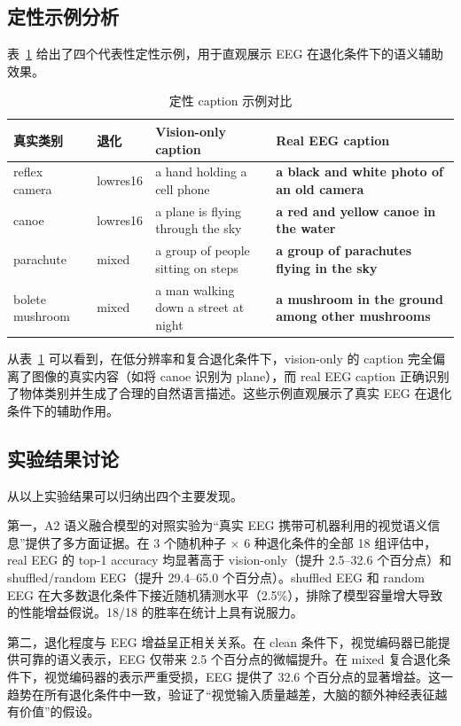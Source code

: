 \subsection{定性示例分析}

表~\ref{tab:qualitative} 给出了四个代表性定性示例，用于直观展示 EEG 在退化条件下的语义辅助效果。

\begin{table}[htbp]
  \centering
  \caption{定性 caption 示例对比}
  \label{tab:qualitative}
  \begin{tabularx}{\linewidth}{l l X X}
    \toprule
    真实类别 & 退化 & Vision-only caption & Real EEG caption \\
    \midrule
    reflex camera & lowres16 & a hand holding a cell phone & \textbf{a black and white photo of an old camera} \\
    canoe & lowres16 & a plane is flying through the sky & \textbf{a red and yellow canoe in the water} \\
    parachute & mixed & a group of people sitting on steps & \textbf{a group of parachutes flying in the sky} \\
    bolete mushroom & mixed & a man walking down a street at night & \textbf{a mushroom in the ground among other mushrooms} \\
    \bottomrule
  \end{tabularx}
\end{table}

从表~\ref{tab:qualitative} 可以看到，在低分辨率和复合退化条件下，vision-only 的 caption 完全偏离了图像的真实内容（如将 canoe 识别为 plane），而 real EEG caption 正确识别了物体类别并生成了合理的自然语言描述。这些示例直观展示了真实 EEG 在退化条件下的辅助作用。

\subsection{实验结果讨论}

从以上实验结果可以归纳出四个主要发现。

第一，A2 语义融合模型的对照实验为``真实 EEG 携带可机器利用的视觉语义信息''提供了多方面证据。在 3 个随机种子 × 6 种退化条件的全部 18 组评估中，real EEG 的 top-1 accuracy 均显著高于 vision-only（提升 2.5--32.6 个百分点）和 shuffled/random EEG（提升 29.4--65.0 个百分点）。shuffled EEG 和 random EEG 在大多数退化条件下接近随机猜测水平（2.5\%），排除了模型容量增大导致的性能增益假说。18/18 的胜率在统计上具有说服力。

第二，退化程度与 EEG 增益呈正相关关系。在 clean 条件下，视觉编码器已能提供可靠的语义表示，EEG 仅带来 2.5 个百分点的微幅提升。在 mixed 复合退化条件下，视觉编码器的表示严重受损，EEG 提供了 32.6 个百分点的显著增益。这一趋势在所有退化条件中一致，验证了``视觉输入质量越差，大脑的额外神经表征越有价值''的假设。

